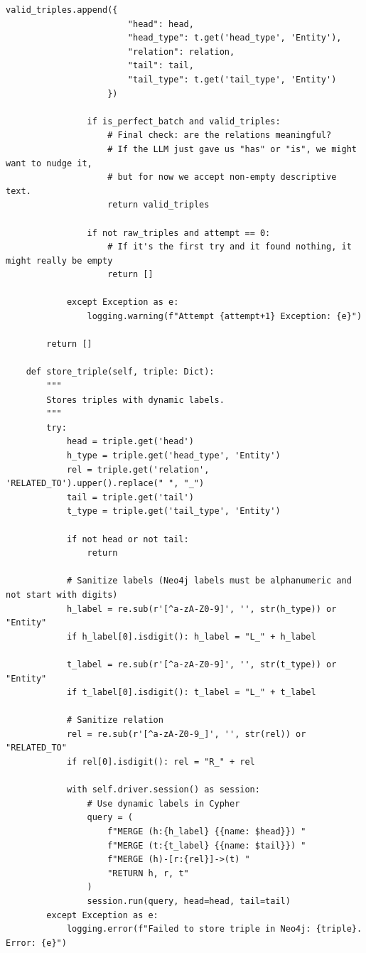 \documentclass[11pt]{article}
\begin{document}
\begin{lstlisting}[style=pythoncode, caption={kg\_generator.py}]
                    valid_triples.append({
                        "head": head,
                        "head_type": t.get('head_type', 'Entity'),
                        "relation": relation,
                        "tail": tail,
                        "tail_type": t.get('tail_type', 'Entity')
                    })

                if is_perfect_batch and valid_triples:
                    # Final check: are the relations meaningful? 
                    # If the LLM just gave us "has" or "is", we might want to nudge it, 
                    # but for now we accept non-empty descriptive text.
                    return valid_triples
                
                if not raw_triples and attempt == 0:
                    # If it's the first try and it found nothing, it might really be empty
                    return []

            except Exception as e:
                logging.warning(f"Attempt {attempt+1} Exception: {e}")
                
        return []

    def store_triple(self, triple: Dict):
        """
        Stores triples with dynamic labels.
        """
        try:
            head = triple.get('head')
            h_type = triple.get('head_type', 'Entity')
            rel = triple.get('relation', 'RELATED_TO').upper().replace(" ", "_")
            tail = triple.get('tail')
            t_type = triple.get('tail_type', 'Entity')
            
            if not head or not tail:
                return

            # Sanitize labels (Neo4j labels must be alphanumeric and not start with digits)
            h_label = re.sub(r'[^a-zA-Z0-9]', '', str(h_type)) or "Entity"
            if h_label[0].isdigit(): h_label = "L_" + h_label
            
            t_label = re.sub(r'[^a-zA-Z0-9]', '', str(t_type)) or "Entity"
            if t_label[0].isdigit(): t_label = "L_" + t_label
            
            # Sanitize relation
            rel = re.sub(r'[^a-zA-Z0-9_]', '', str(rel)) or "RELATED_TO"
            if rel[0].isdigit(): rel = "R_" + rel

            with self.driver.session() as session:
                # Use dynamic labels in Cypher
                query = (
                    f"MERGE (h:{h_label} {{name: $head}}) "
                    f"MERGE (t:{t_label} {{name: $tail}}) "
                    f"MERGE (h)-[r:{rel}]->(t) "
                    "RETURN h, r, t"
                )
                session.run(query, head=head, tail=tail)
        except Exception as e:
            logging.error(f"Failed to store triple in Neo4j: {triple}. Error: {e}")


\end{lstlisting}
\end{document}

